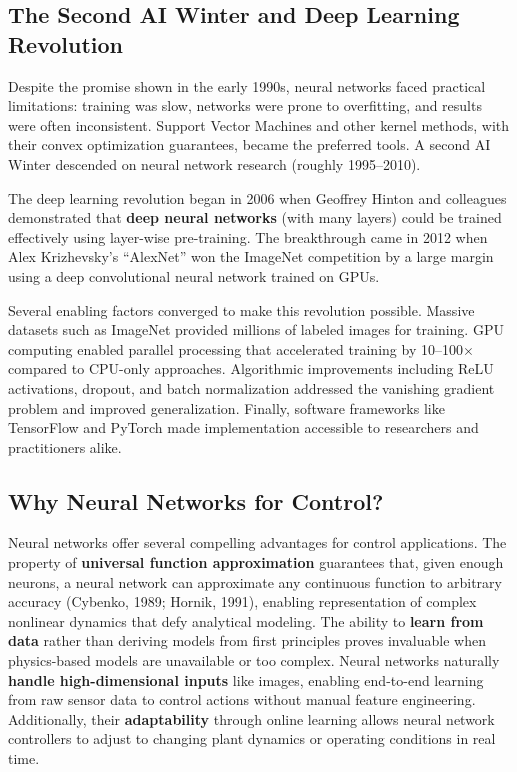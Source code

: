 \subsection{The Second AI Winter and Deep Learning Revolution}

Despite the promise shown in the early 1990s, neural networks faced practical limitations: training was slow, networks were prone to overfitting, and results were often inconsistent. Support Vector Machines and other kernel methods, with their convex optimization guarantees, became the preferred tools. A second AI Winter descended on neural network research (roughly 1995--2010).

The deep learning revolution began in 2006 when Geoffrey Hinton and colleagues demonstrated that \textbf{deep neural networks} (with many layers) could be trained effectively using layer-wise pre-training. The breakthrough came in 2012 when Alex Krizhevsky's ``AlexNet'' won the ImageNet competition by a large margin using a deep convolutional neural network trained on GPUs.

Several enabling factors converged to make this revolution possible. Massive datasets such as ImageNet provided millions of labeled images for training. GPU computing enabled parallel processing that accelerated training by 10--100$\times$ compared to CPU-only approaches. Algorithmic improvements including ReLU activations, dropout, and batch normalization addressed the vanishing gradient problem and improved generalization. Finally, software frameworks like TensorFlow and PyTorch made implementation accessible to researchers and practitioners alike.

\subsection{Why Neural Networks for Control?}

Neural networks offer several compelling advantages for control applications. The property of \textbf{universal function approximation} guarantees that, given enough neurons, a neural network can approximate any continuous function to arbitrary accuracy (Cybenko, 1989; Hornik, 1991), enabling representation of complex nonlinear dynamics that defy analytical modeling. The ability to \textbf{learn from data} rather than deriving models from first principles proves invaluable when physics-based models are unavailable or too complex. Neural networks naturally \textbf{handle high-dimensional inputs} like images, enabling end-to-end learning from raw sensor data to control actions without manual feature engineering. Additionally, their \textbf{adaptability} through online learning allows neural network controllers to adjust to changing plant dynamics or operating conditions in real time.

